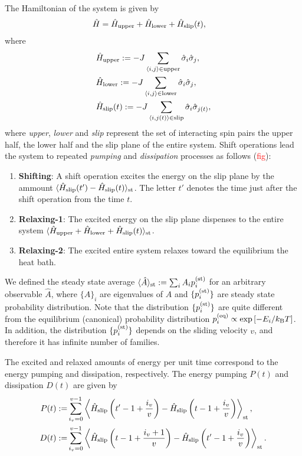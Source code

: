 The Hamiltonian of the system is given by
\begin{align}
&\hat{H}=\hat{H}_{\rm upper} + \hat{H}_{\rm lower} + \hat{H}_{\rm slip}(t),
\end{align}
where
\begin{align}
&\hat{H}_{\rm upper}:=-J\sum_{\langle i,j\rangle\in\mathrm{upper}}\hat{\sigma}_{i}\hat{\sigma}_{j}\label{ham:upper}, \\
&\hat{H}_{\rm lower}:=-J\sum_{\langle i,j\rangle\in\mathrm{lower}}\hat{\sigma}_{i}\hat{\sigma}_{j}\label{ham:lower}, \\
&\hat{H}_{\rm slip}(t):=-J\sum_{\langle i,j(t)\rangle\in\mathrm{slip}}\hat{\sigma}_{i}\hat{\sigma}_{j(t)}\label{ham:slip},
\end{align}
where \textit{upper}, \textit{lower} and \textit{slip} represent the set of interacting spin pairs the upper half, the lower half and the slip plane of the entire system.
Shift operations lead the system to repeated \textit{pumping} and \textit{dissipation} processes as follows (\textcolor{red}{fig}):
\begin{enumerate}
	\item \textbf{Shifting}: A shift operation excites the energy on the slip plane by the ammount $\langle\hat{H}_{\rm slip}(t')-\hat{H}_{\rm slip}(t)\rangle_{\rm st}$. The letter $t'$ denotes the time just after the shift operation from the time $t$.
	\item \textbf{Relaxing-1}: The excited energy on the slip plane dispenses to the entire system $\langle\hat{H}_{\rm upper} + \hat{H}_{\rm lower} + \hat{H}_{\rm slip}(t)\rangle_{\rm st}$.
	\item \textbf{Relaxing-2}: The excited entire system relaxes toward the equilibrium the heat bath.
\end{enumerate}
We defined the steady state average $\langle\hat{A}\rangle_{\rm st}:=\sum_{i}A_{i}p^{(\rm st)}_{i}$ for an arbitrary observable $\hat{A}$, where $\{A\}_{i}$ are eigenvalues of $\hat{A}$ and $\{p^{(\rm st)}_{i}\}$ are steady state probability distribution. Note that the distribution $\{p^{(\rm st)}_{i}\}$ are quite different from the equilibrium (canonical) probability distribution $p^{(\rm eq)}_{i}\propto\exp\left[-E_{i}/k_{\rm B} T\right]$. In addition, the distribution $\{p^{(\rm st)}_{i}\}$ depends on the sliding velocity $v$, and therefore it has infinite number of families. 

The excited and relaxed amounts of energy per unit time correspond to the energy pumping and dissipation, respectively. The energy pumping $P(t)$ and dissipation $D(t)$ are given by
\begin{align}
P(t):=&\sum_{i_{v}=0}^{v-1}\left\langle \hat{H}_{\rm slip}\left(t'-1+\frac{i_{v}}{v}\right) - \hat{H}_{\rm slip}\left(t-1+\frac{i_{v}}{v}\right)\right\rangle_{\rm st},\\
D(t):=&\sum_{i_{v}=0}^{v-1}\left\langle \hat{H}_{\rm slip}\left(t-1+\frac{i_{v}+1}{v}\right) - \hat{H}_{\rm slip}\left(t'-1+\frac{i_{v}}{v}\right)\right\rangle_{\rm st}.
\end{align}


